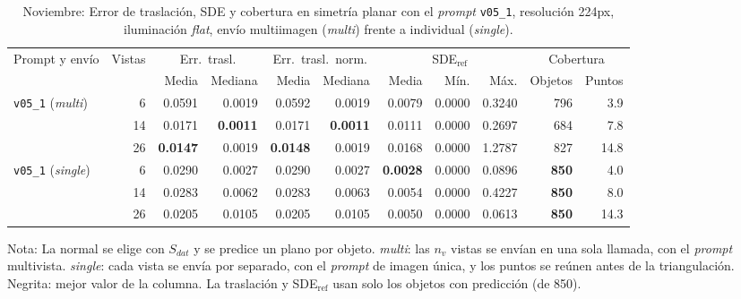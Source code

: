 \begin{table}[htbp]
\centering
\caption{Noviembre: Error de traslación, SDE y cobertura en simetría planar con el \textit{prompt} \texttt{v05\_1}, resolución 224px, iluminación \textit{flat}, envío multiimagen (\textit{multi}) frente a individual (\textit{single}).}
\label{tab:nov_plane_modo_envio_posicion}
\begin{lrbox}{\tablebox}
\begin{adjustbox}{max width=\textwidth}
\begin{tabular}{lrrrrrrrrrr}
\toprule
\multirow{2}{*}{Prompt y envío} & \multirow{2}{*}{Vistas} & \multicolumn{2}{c}{Err.\ trasl.} & \multicolumn{2}{c}{Err.\ trasl.\ norm.} & \multicolumn{3}{c}{SDE$_{\mathrm{ref}}$} & \multicolumn{2}{c}{Cobertura} \\
\cmidrule(lr){3-4} \cmidrule(lr){5-6} \cmidrule(lr){7-9} \cmidrule(lr){10-11}
 &  & Media & Mediana & Media & Mediana & Media & Mín. & Máx. & Objetos & Puntos \\
\midrule
\multirow{3}{*}{\texttt{v05\_1} (\textit{multi})} & 6 & 0.0591 & 0.0019 & 0.0592 & 0.0019 & 0.0079 & 0.0000 & 0.3240 & 796 & 3.9 \\
 & 14 & 0.0171 & \textbf{0.0011} & 0.0171 & \textbf{0.0011} & 0.0111 & 0.0000 & 0.2697 & 684 & 7.8 \\
 & 26 & \textbf{0.0147} & 0.0019 & \textbf{0.0148} & 0.0019 & 0.0168 & 0.0000 & 1.2787 & 827 & 14.8 \\
\midrule
\multirow{3}{*}{\texttt{v05\_1} (\textit{single})} & 6 & 0.0290 & 0.0027 & 0.0290 & 0.0027 & \textbf{0.0028} & 0.0000 & 0.0896 & \textbf{850} & 4.0 \\
 & 14 & 0.0283 & 0.0062 & 0.0283 & 0.0063 & 0.0054 & 0.0000 & 0.4227 & \textbf{850} & 8.0 \\
 & 26 & 0.0205 & 0.0105 & 0.0205 & 0.0105 & 0.0050 & 0.0000 & 0.0613 & \textbf{850} & 14.3 \\
\bottomrule
\end{tabular}
\end{adjustbox}
\end{lrbox}
\usebox{\tablebox}

\vspace{1.5ex}
\begin{minipage}{\wd\tablebox}
\footnotesize
Nota: La normal se elige con $S_{dat}$ y se predice un plano por objeto. \textit{multi}: las $n_v$ vistas se envían en una sola llamada, con el \textit{prompt} multivista. \textit{single}: cada vista se envía por separado, con el \textit{prompt} de imagen única, y los puntos se reúnen antes de la triangulación. Negrita: mejor valor de la columna. La traslación y SDE$_{\mathrm{ref}}$ usan solo los objetos con predicción (de 850).
\end{minipage}
\end{table}

